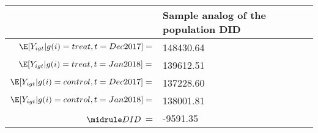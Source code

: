 \begin{tabular}{rl}
\toprule
 & Sample analog of the population DID \\
\midrule
$\E [Y_{igt}|g(i) = treat, t=Dec2017] = $ & 148430.64 \\
$\E [Y_{igt}|g(i) = treat, t=Jan2018] = $ & 139612.51 \\
$\E [Y_{igt}|g(i) = control, t=Dec2017] = $ & 137228.60 \\
$\E [Y_{igt}|g(i) = control, t=Jan2018] = $ & 138001.81 \\
$\midrule DID$ =  & -9591.35 \\
\bottomrule
\end{tabular}
